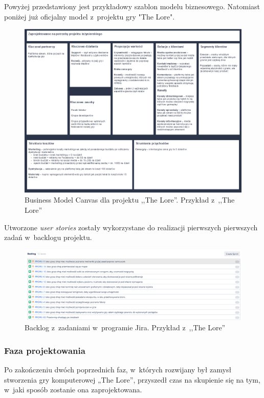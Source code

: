 \documentclass[oneside,polski,logo]{amuthesis}
\begin{document}
Powyżej przedstawiony jest przykładowy szablon modelu biznesowego. Natomiast poniżej już oficjalny model z~projektu gry "The Lore".
\newpage
\begin{figure}[h]
	\centering
	\includegraphics[width=13cm]{images/hyps/BMC - The Lore.png}
	\caption{Business Model Canvas dla projektu ,,The Lore''. Przykład z~,,The Lore''}
\end{figure}

Utworzone \emph{user stories} zostały wykorzystane do realizacji pierwszych pierwszych zadań w~backlogu projektu.

\begin{figure}[hb!]
	\centering
	\includegraphics[width=13cm]{images/hyps/backlog.png}
	\caption{Backlog z~zadaniami w~programie Jira. Przykład z~,,The Lore''}
\end{figure}

\subsubsection{Faza projektowania}

Po zakończeniu dwóch poprzednich faz, w~których rozwijany był zamysł stworzenia gry komputerowej „The Lore”, przyszedł czas na skupienie się na tym, w~jaki sposób zostanie ona zaprojektowana.
\end{document}
